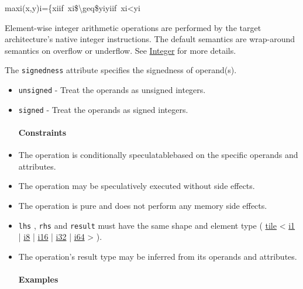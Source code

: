\documentclass{article}
\begin{document}
maxi(x,y)i=\{xiif xi\$\textbackslash{}geq\$yiyiif xi<yi

Element-wise integer arithmetic operations are performed by the target architecture's native integer instructions. The default semantics are wrap-around semantics on overflow or underflow. See \href{https://docs.nvidia.com/cuda/tile-ir/latest/sections/operations.html#op-group-integer}{Integer} for more details.


The \texttt{signedness} attribute specifies the signedness of operand(s).


\begin{itemize}
\item \texttt{unsigned} - Treat the operands as unsigned integers.
\item \texttt{signed} - Treat the operands as signed integers.


\paragraph{Constraints}

\item The operation is conditionally speculatablebased on the specific operands and attributes.
\item The operation may be speculatively executed without side effects.
\item The operation is pure and does not perform any memory side effects.
\item \texttt{lhs} , \texttt{rhs} and \texttt{result} must have the same shape and element type ( \href{https://docs.nvidia.com/cuda/tile-ir/latest/sections/types.html#type-tile}{tile} < \href{https://docs.nvidia.com/cuda/tile-ir/latest/sections/types.html#subsection-element-types}{i1} | \href{https://docs.nvidia.com/cuda/tile-ir/latest/sections/types.html#subsection-element-types}{i8} | \href{https://docs.nvidia.com/cuda/tile-ir/latest/sections/types.html#subsection-element-types}{i16} | \href{https://docs.nvidia.com/cuda/tile-ir/latest/sections/types.html#subsection-element-types}{i32} | \href{https://docs.nvidia.com/cuda/tile-ir/latest/sections/types.html#subsection-element-types}{i64} > ).
\item The operation's result type may be inferred from its operands and attributes.


\paragraph{Examples}


\end{itemize}
\end{document}
